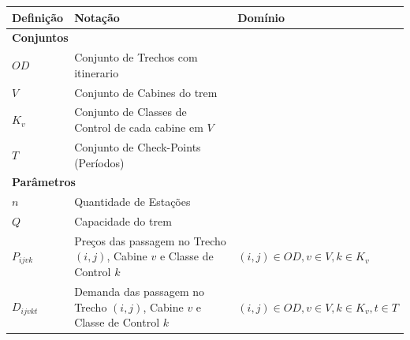 \begin{table}[h]
	\centering
	\small
	\begin{tabular}{p{2cm} p{9.5cm} p{3.2cm}}
		\toprule
		\textbf{Definição} & \textbf{Notação}                                                                                            & \textbf{Domínio}                            \\ \midrule
		\multicolumn{3}{l}{\textbf{Conjuntos}}                                                                                                                                         \\ \midrule
		$OD$               & Conjunto de Trechos com itinerario                                                                          &                                             \\
		$V$                & Conjunto de Cabines do trem                                                                                 &                                             \\
		$K_v$              & Conjunto de Classes de Control de cada cabine em $V$                                                        &                                             \\
		$T$                & Conjunto de Check-Points (Períodos)                                                                         &                                             \\ \midrule
		\multicolumn{3}{l}{\textbf{Parâmetros}}                                                                                                                                        \\ \midrule
		$n$                & Quantidade de Estações                                                                                      &                                             \\
		$Q$                & Capacidade do trem                                                                                          &                                             \\
		$P_{ijvk}$         & Preços  das passagem no Trecho $(i,j)$, Cabine $v$ e Classe de Control $k$                                  & $(i,j) \in OD,v \in V, k \in K_v$           \\
		$D_{ijvkt}$        & Demanda  das passagem no Trecho $(i,j)$, Cabine $v$ e Classe de Control $k$                                 & $(i,j) \in OD,v \in V, k \in K_v, t \in T$  \\ \midrule

\end{tabular}
\end{table}
